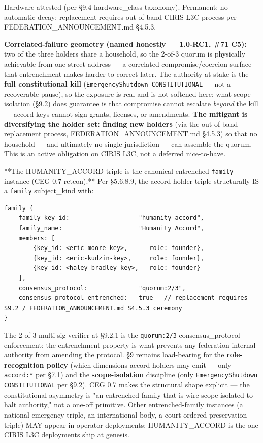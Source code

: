 \documentclass[10pt]{article}
\begin{document}
Hardware-attested (per §9.4 hardware\_class taxonomy). Permanent: no automatic decay; replacement requires out-of-band CIRIS L3C process per FEDERATION\_ANNOUNCEMENT.md §4.5.3.


\textbf{Correlated-failure geometry (named honestly — 1.0-RC1, \#71 C5):} two of the three holders share a household, so the 2-of-3 quorum is physically achievable from one street address — a correlated compromise/coercion surface that entrenchment makes harder to correct later. The authority at stake is the \textbf{full constitutional kill} (\texttt{EmergencyShutdown CONSTITUTIONAL} — not a recoverable pause), so the exposure is real and is not softened here; what scope isolation (§9.2) does guarantee is that compromise cannot escalate \textit{beyond} the kill — accord keys cannot sign grants, licenses, or amendments. \textbf{The mitigant is diversifying the holder set: finding new holders} (via the out-of-band replacement process, FEDERATION\_ANNOUNCEMENT.md §4.5.3) so that no household — and ultimately no single jurisdiction — can assemble the quorum. This is an active obligation on CIRIS L3C, not a deferred nice-to-have.


**The HUMANITY\_ACCORD triple is the canonical entrenched-\texttt{family} instance (CEG 0.7 retcon).** Per §5.6.8.9, the accord-holder triple structurally IS a \texttt{family} subject\_kind with:


\begin{lstlisting}
family {
    family_key_id:                   "humanity-accord",
    family_name:                     "Humanity Accord",
    members: [
        {key_id: <eric-moore-key>,      role: founder},
        {key_id: <eric-kudzin-key>,     role: founder},
        {key_id: <haley-bradley-key>,   role: founder}
    ],
    consensus_protocol:              "quorum:2/3",
    consensus_protocol_entrenched:   true   // replacement requires S9.2 / FEDERATION_ANNOUNCEMENT.md S4.5.3 ceremony
}
\end{lstlisting}

The 2-of-3 multi-sig verifier at §9.2.1 is the \texttt{quorum:2/3} consensus\_protocol enforcement; the entrenchment property is what prevents any federation-internal authority from amending the protocol. §9 remains load-bearing for the \textbf{role-recognition policy} (which dimensions accord-holders may emit — only \texttt{accord:*} per §7.1) and the \textbf{scope-isolation} discipline (only \texttt{EmergencyShutdown CONSTITUTIONAL} per §9.2). CEG 0.7 makes the structural shape explicit — the constitutional asymmetry is "an entrenched family that is wire-scope-isolated to halt authority," not a one-off primitive. Other entrenched-family instances (a national-emergency triple, an international body, a court-ordered preservation triple) MAY appear in operator deployments; HUMANITY\_ACCORD is the one CIRIS L3C deployments ship at genesis.
\end{document}
